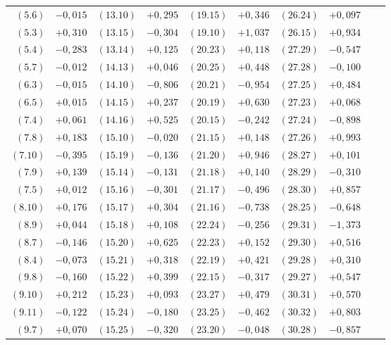 \documentclass[12pt,a4paper]{article}
\theoremstyle{plain}
\theoremstyle{definition}
\theoremstyle{remark}
\begin{document}
\begin{center}
\begin{tabular}{r@{${}= {}$}lr@{${}= {}$}lr@{${}= {}$}lr@{${}= {}$}lr@{${}= {}$}l}
$(5.6)$ & $-0{,}015$ & $(13.10)$ & $+0{,}295$ & $(19.15)$ & $+0{,}346$ & $(26.24)$ & $+0{,}097$\\
$(5.3)$ & $+0{,}310$ & $(13.15)$ & $-0{,}304$ & $(19.10)$ & $+1{,}037$ & $(26.15)$ & $+0{,}934$\\
$(5.4)$ & $-0{,}283$ & $(13.14)$ & $+0{,}125$ & $(20.23)$ & $+0{,}118$ & $(27.29)$ & $-0{,}547$\\
$(5.7)$ & $-0{,}012$ & $(14.13)$ & $+0{,}046$ & $(20.25)$ & $+0{,}448$ & $(27.28)$ & $-0{,}100$\\
$(6.3)$ & $-0{,}015$ & $(14.10)$ & $-0{,}806$ & $(20.21)$ & $-0{,}954$ & $(27.25)$ & $+0{,}484$\\
$(6.5)$ & $+0{,}015$ & $(14.15)$ & $+0{,}237$ & $(20.19)$ & $+0{,}630$ & $(27.23)$ & $+0{,}068$\\
$(7.4)$ & $+0{,}061$ & $(14.16)$ & $+0{,}525$ & $(20.15)$ & $-0{,}242$ & $(27.24)$ & $-0{,}898$\\
$(7.8)$ & $+0{,}183$ & $(15.10)$ & $-0{,}020$ & $(21.15)$ & $+0{,}148$ & $(27.26)$ & $+0{,}993$\\
$(7.10)$ & $-0{,}395$ & $(15.19)$ & $-0{,}136$ & $(21.20)$ & $+0{,}946$ & $(28.27)$ & $+0{,}101$\\
$(7.9)$ & $+0{,}139$ & $(15.14)$ & $-0{,}131$ & $(21.18)$ & $+0{,}140$ & $(28.29)$ & $-0{,}310$\\
$(7.5)$ & $+0{,}012$ & $(15.16)$ & $-0{,}301$ & $(21.17)$ & $-0{,}496$ & $(28.30)$ & $+0{,}857$\\
$(8.10)$ & $+0{,}176$ & $(15.17)$ & $+0{,}304$ & $(21.16)$ & $-0{,}738$ & $(28.25)$ & $-0{,}648$\\
$(8.9)$ & $+0{,}044$ & $(15.18)$ & $+0{,}108$ & $(22.24)$ & $-0{,}256$ & $(29.31)$ & $-1{,}373$\\
$(8.7)$ & $-0{,}146$ & $(15.20)$ & $+0{,}625$ & $(22.23)$ & $+0{,}152$ & $(29.30)$ & $+0{,}516$\\
$(8.4)$ & $-0{,}073$ & $(15.21)$ & $+0{,}318$ & $(22.19)$ & $+0{,}421$ & $(29.28)$ & $+0{,}310$\\
$(9.8)$ & $-0{,}160$ & $(15.22)$ & $+0{,}399$ & $(22.15)$ & $-0{,}317$ & $(29.27)$ & $+0{,}547$\\
$(9.10)$ & $+0{,}212$ & $(15.23)$ & $+0{,}093$ & $(23.27)$ & $+0{,}479$ & $(30.31)$ & $+0{,}570$\\
$(9.11)$ & $-0{,}122$ & $(15.24)$ & $-0{,}180$ & $(23.25)$ & $-0{,}462$ & $(30.32)$ & $+0{,}803$\\
$(9.7)$ & $+0{,}070$ & $(15.25)$ & $-0{,}320$ & $(23.20)$ & $-0{,}048$ & $(30.28)$ & $-0{,}857$\\
\end{tabular}
\end{center}
\end{document}

